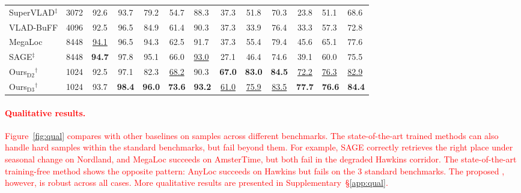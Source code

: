 \begin{table}[!htb]
{\begin{tabular}{ll cccc|M cccc|M M}
SuperVLAD$^\ddag$ & 3072 & 92.6 & 93.7 & 79.2 & 54.7 & 88.3 & 37.3 & 51.8 & 70.3 & 23.8 & 51.1 & 68.6 \\
VLAD-BuFF & 4096 & 92.5 & 96.5 & 84.9 & 61.4 & 90.3 & 37.3 & 33.9 & 76.4 & 33.3 & 57.3 & 72.8 \\
MegaLoc & 8448 & \underline{94.1} & 96.5 & 94.3 & 62.5 & 91.7 & 37.3 & 55.4 & 79.4 & 45.6 & 65.1 & 77.6 \\
SAGE$^\ddag$ & 8448 & \textbf{94.7} & 97.8 & 95.1 & 66.0 & \underline{93.0} & 27.1 & 46.4 & 74.6 & 39.1 & 60.0 & 75.5 \\
\midrule
Ours$_{\mathrm{D2}}$$^{\dagger}$ & 1024 & 92.5 & 97.1 & 82.3 & \underline{68.2} & 90.3 & \textbf{67.0} & \textbf{83.0} & \textbf{84.5} & \underline{72.2} & \underline{76.3} & \underline{82.9} \\
Ours$_{\mathrm{D3}}$$^{\dagger}$ & 1024 & 93.7 & \textbf{98.4} & \textbf{96.0} & \textbf{73.6} & \textbf{93.2} & \underline{61.0} & \underline{75.9} & \underline{83.5} & \textbf{77.7} & \textbf{76.6} & \textbf{84.4} \\
\bottomrule
\end{tabular}%
}
\end{table}


\textcolor{red}{\paragraph{Qualitative results.} Figure~\ref{fig:qual} compares \method{} with other baselines on samples across different benchmarks. The state-of-the-art trained methods can also handle hard samples within the standard benchmarks, but fail beyond them. For example, SAGE correctly retrieves the right place under seasonal change on Nordland, and MegaLoc succeeds on AmsterTime, but both fail in the degraded Hawkins corridor. The state-of-the-art training-free method shows the opposite pattern: AnyLoc succeeds on Hawkins but fails on the 3 standard benchmarks. The proposed \method{}, however, is robust across all cases. More qualitative results are presented in Supplementary~\S\ref{app:qual}.}

